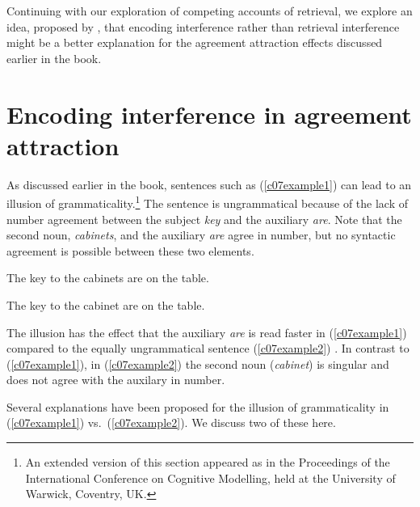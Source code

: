 \documentclass{cambridge7A}\usepackage[]{graphicx}\usepackage[]{color}
\begin{document}
Continuing with our exploration of  competing accounts of retrieval, we explore an idea, proposed by \cite{VillataFranck}, that encoding interference rather  than retrieval interference might be a better explanation for the agreement attraction effects discussed earlier in the book.

\section{Encoding interference in agreement attraction} \label{encint}

As discussed earlier in the book, sentences such as (\ref{c07example1}) can lead to an illusion of grammaticality.\footnote{An  extended version of this section appeared as \cite{VasishthEtAlICCM2017} in the Proceedings of the International Conference on Cognitive Modelling, held at the University of Warwick, Coventry, UK.}
The sentence is
ungrammatical because of the lack of number agreement between
the subject \textit{key} and the auxiliary \textit{are}.
Note that the second noun, \textit{cabinets}, and the auxiliary \textit{are} agree in number, but no syntactic agreement is possible between these two elements.

\begin{exe} 
\ex
\begin{xlist}
\item \label{c07example1}
The key to the cabinets are on the table.
\item \label{c07example2}
The key to the cabinet are on the table.
\end{xlist}
\end{exe}

The illusion has the effect that
 the auxiliary \textit{are} is read faster in (\ref{c07example1}) compared to the equally ungrammatical sentence (\ref{c07example2}) \citep[see][for a review]{JaegerEngelmannVasishth2017}. In contrast to (\ref{c07example1}), in (\ref{c07example2}) the second noun (\textit{cabinet}) is singular and does not agree with the auxilary in number.

Several explanations have been proposed for the illusion of grammaticality in (\ref{c07example1}) vs.\ (\ref{c07example2}).
We discuss two of these here.
\end{document}
